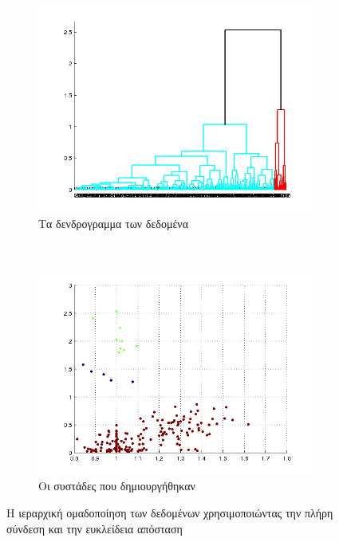 \documentclass{assignment}
\begin{document}
\begin{figure}[htbp]
  \centering
  \begin{subfigure}[b]{0.5\textwidth}
     \includegraphics[width=\textwidth,height=0.25\textheight]{matlab/hierarchical_dendogram_complete_euclidean.png}
  \caption{Τα δενδρογραμμα των δεδομένα}
  \end{subfigure}%
   ~ %
  \begin{subfigure}[b]{0.5\textwidth}
    \includegraphics[width=\textwidth,height=0.25\textheight]{matlab/identified_clusters_complete_euclidean.png}
  \caption{Οι συστάδες που δημιουργήθηκαν}
  \end{subfigure}
  \caption{Η ιεραρχική ομαδοποίηση των δεδομένων χρησιμοποιώντας την πλήρη σύνδεση και την ευκλείδεια απόσταση}
\label{fig:clustering_complete_euclidean}
\end{figure}



 \label{Βιβλιογραφία}



\newpage
\end{document}
